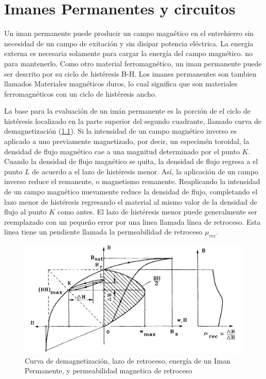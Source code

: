 \documentclass[12pt]{book}
\theoremstyle{definition}
\theoremstyle{remark}
\theoremstyle{plain}
\begin{document}
\chapter{Imanes Permanentes y circuitos}

Un iman permanente puede producir un campo magnético en el entrehierro sin necesidad de un campo de exitación y sin disipar potencia eléctrica. La energía externa es necesaria solamente para cargar la energía del campo magnético. no para mantenerlo. Como otro material ferromagnético, un iman permanente puede ser descrito por su ciclo de histéresis B-H. Los imanes permanentes son tambien llamados Materiales magnéticos duros, lo cual significa que son materiales ferromagnéticos con un ciclo de histéresis ancho. 

La base para la evaluación de un imán permanente es la porción de el ciclo de histéresis localizado en la parte superior del segundo cuadrante, llamado curva de demagnetización (\ref{fig304}). Si la intensidad de un campo magnético inverso es aplicado a uno previamente magnetizado, por decir, un especimén toroidal, la densidad de flujo magnético cae a una magnitud determinado por el punto $K$. Cuando la densidad de  flujo magnético se quita, la densidad de flujo regresa a el punto $L$ de acuerdo a el lazo de histéresis menor. Así, la aplicación de un campo inverso reduce el remanente, o magnetismo remanente. Reaplicando la intensidad de un campo magnético nuevamente reduce la densidad de flujo, completando el lazo menor de histéresis regresando el material al mismo valor de la densidad de flujo al punto $K$ como antes. El lazo de histéresis menor puede generalmente ser reemplazado con un pequeño error por una linea llamada línea de retroceso. Esta linea tiene un pendiente llamada la permeabilidad de retroceso $\mu_{rec}$.

\begin{figure}
\centering
\includegraphics[width=5in]{demagne.jpg}
\caption{Curva de demagnetización, lazo de retroceso, energía de un Iman Permanente, y permeabilidad magnetica de retroceso }
\label{fig304}
\end{figure}
\end{document}
